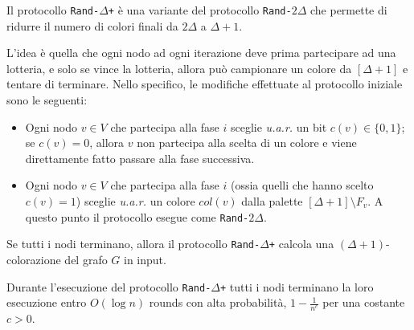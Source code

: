 Il protocollo \texttt{Rand-$\Delta$+} è una variante del protocollo \texttt{Rand-$2\Delta$} che permette di ridurre il numero di colori finali da $2\Delta$ a $\Delta + 1$. 

L'idea è quella che ogni nodo ad ogni iterazione deve prima partecipare ad una lotteria, e solo se vince la lotteria, allora può campionare un colore da $[\Delta + 1]$ e tentare di terminare. Nello specifico, le modifiche effettuate al protocollo iniziale sono le seguenti:
\begin{itemize}
    \item Ogni nodo $v \in V$ che partecipa alla fase $i$ sceglie \textit{u.a.r.} un bit $c(v) \in \{0,1\}$; se $c(v) = 0$, allora $v$ non partecipa alla scelta di un colore e viene direttamente fatto passare alla fase successiva.
    \item Ogni nodo $v \in V$ che partecipa alla fase $i$ (ossia quelli che hanno scelto $c(v) = 1$) sceglie \textit{u.a.r.} un colore $col(v)$ dalla palette $[\Delta + 1] \setminus F_v$. A questo punto il protocollo esegue come \texttt{Rand-$2\Delta$}.
\end{itemize}

\begin{teorema}[Correttezza]
    Se tutti i nodi terminano, allora il protocollo \texttt{Rand-$\Delta$+} calcola una $(\Delta + 1)$-colorazione del grafo $G$ in input.
\end{teorema}

\begin{teorema}
    Durante l'esecuzione del protocollo \texttt{Rand-$\Delta$+} tutti i nodi terminano la loro esecuzione entro $O(\log n)$ rounds con alta probabilità, $1 - \frac{1}{n^c}$ per una costante $c > 0$.
\end{teorema}
